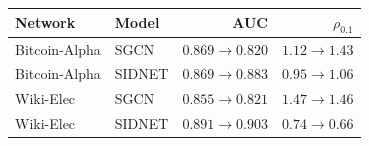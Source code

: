 \begin{tabular}{@{}llrr@{}}
\toprule
Network & Model & AUC & $\rho_{0.1}$ \\
\midrule
Bitcoin-Alpha & SGCN & $0.869\to0.820$ & $1.12\to1.43$ \\
Bitcoin-Alpha & SIDNET & $0.869\to0.883$ & $0.95\to1.06$ \\
Wiki-Elec & SGCN & $0.855\to0.821$ & $1.47\to1.46$ \\
Wiki-Elec & SIDNET & $0.891\to0.903$ & $0.74\to0.66$ \\
\bottomrule
\end{tabular}
